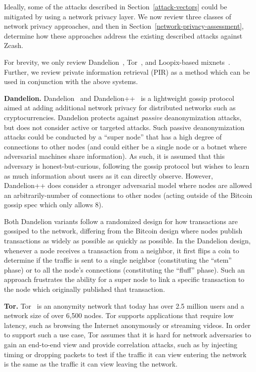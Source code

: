 \documentclass{article}
\begin{document}
Ideally, some of the attacks described in Section~\ref{attack-vectors} could be
mitigated by using a network privacy layer. We now review three
classes of network privacy approaches, and then in
Section~\ref{network-privacy-assessment}, determine how these approaches
address the existing described attacks against Zcash.

For brevity, we only review
Dandelion~\cite{Fanti:2018:DLC,BojjaVenkatakrishnan:2017:DRB},
Tor~\cite{tor-specification}, and
Loopix-based mixnets~\cite{Piotrowska:2017:LAS}.
Further, we review private information retrieval (PIR) as a method which can be
used in conjunction with the above systems.

\textbf{Dandelion.}
Dandelion~\cite{BojjaVenkatakrishnan:2017:DRB} and
Dandelion++~\cite{Fanti:2018:DLC} is a lightweight gossip protocol aimed at
adding additional network privacy for
distributed networks such as cryptocurrencies. Dandelion protects against
\emph{passive}
deanonymization attacks, but does not consider active or targeted attacks. Such
passive deanonymization attacks could be conducted by a ``super node'' that has
a high degree of connections to other nodes (and could either be a single node
or a botnet where adversarial machines share information). As such, it is
assumed that this adversary is honest-but-curious, following the gossip protocol
but wishes to learn as much information about users as it can directly observe.
However, Dandelion++ does consider a stronger adversarial model where nodes are
allowed an arbitrarily-number of connections to other nodes (acting outside of the
Bitcoin gossip spec which only allows 8).

Both Dandelion variants follow a randomized design for how transactions are
gossiped to the network, differing from the Bitcoin design where nodes publish
transactions as widely as possible as quickly as possible. In the Dandelion
design, whenever a node receives a transaction from a neighbor, it
first flips a coin to determine if the traffic is sent to a single
neighbor (constituting the ``stem'' phase) or to all the node's connections
(constituting the ``fluff'' phase). Such an approach frustrates the ability for
a super node to link a specific transaction to the node which originally
published that transaction.


\textbf{Tor.}
Tor~\cite{tor-specification} is an anonymity network that today has over 2.5
million users and a network
size of over 6,500 nodes. Tor supports applications that require low latency,
such as browsing the Internet anonymously or streaming videos. In order to
support such a use case, Tor assumes that it is hard for network adversaries to
gain an end-to-end view and provide correlation attacks, such as by injecting
timing or dropping packets to test if the traffic it can view entering the
network is the same as the traffic it can view leaving the network.
\end{document}

